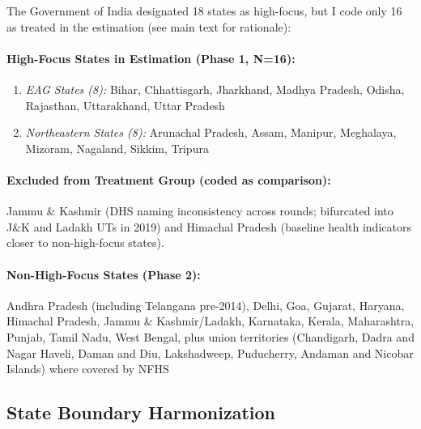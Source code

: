 \documentclass[12pt]{article}
\begin{document}
The Government of India designated 18 states as high-focus, but I code only 16 as treated in the estimation (see main text for rationale):

\paragraph{High-Focus States in Estimation (Phase 1, N=16):}
\begin{enumerate}
    \item \textit{EAG States (8):} Bihar, Chhattisgarh, Jharkhand, Madhya Pradesh, Odisha, Rajasthan, Uttarakhand, Uttar Pradesh
    \item \textit{Northeastern States (8):} Arunachal Pradesh, Assam, Manipur, Meghalaya, Mizoram, Nagaland, Sikkim, Tripura
\end{enumerate}

\paragraph{Excluded from Treatment Group (coded as comparison):}
Jammu \& Kashmir (DHS naming inconsistency across rounds; bifurcated into J\&K and Ladakh UTs in 2019) and Himachal Pradesh (baseline health indicators closer to non-high-focus states).

\paragraph{Non-High-Focus States (Phase 2):}
Andhra Pradesh (including Telangana pre-2014), Delhi, Goa, Gujarat, Haryana, Himachal Pradesh, Jammu \& Kashmir/Ladakh, Karnataka, Kerala, Maharashtra, Punjab, Tamil Nadu, West Bengal, plus union territories (Chandigarh, Dadra and Nagar Haveli, Daman and Diu, Lakshadweep, Puducherry, Andaman and Nicobar Islands) where covered by NFHS

\subsection{State Boundary Harmonization}
\end{document}

